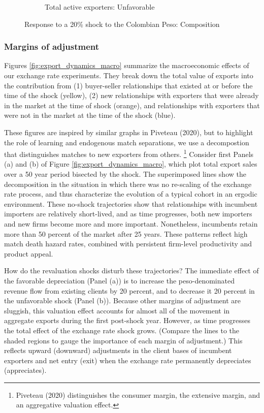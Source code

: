 \documentclass[12pt]{article}
\begin{document}
\begin{figure}[tbp]
\begin{subfigure}[b]{0.5\textwidth}
        \caption{Total active exporters: Unfavorable}
    \end{subfigure}
\caption{Response to a 20\% shock to the Colombian Peso: Composition}
\label{fig:export_dynamics_average}
\end{figure}

\subsubsection{Margins of adjustment }

Figures \ref{fig:export_dynamics_macro} summarize the macroeconomic effects
of our exchange rate experiments. They break down the total value of exports
into the contribution from (1) buyer-seller relationships that existed at or
before the time of the shock (yellow), (2) new relationships with exporters
that were already in the market at the time of shock (orange), and
relationships with exporters that were not in the market at the time of the
shock (blue).

These figures are inspired by similar graphs in Piveteau (2020), but to
highlight the role of learning and endogenous match separations, we use a
decompostion that distinguishes matches to new exporters from others.%
\footnote{%
Piveteau (2020) distinguishes the consumer margin, the extensive margin, and
an aggregative valuation effect.} Consider first Panels (a) and (b) of
Figure \ref{fig:export_dynamics_macro}, which plot total export sales over a
50 year period bisected by the shock. The superimposed lines show the
decomposition in the situation in which there was no re-scaling of the
exchange rate process, and thus characterize the evolution of a typical
cohort in an ergodic environment. These no-shock trajectories show that
relationships with incumbent importers are relatively short-lived, and as
time progresses, both new importers and new firms become more and more
important. Nonetheless, incumbents retain more than 50 percent of the market
after 25 years. These patterns reflect high match death hazard rates,
combined with persistent firm-level productivity and product appeal.

How do the revaluation shocks disturb these trajectories? The immediate
effect of the favorable depreciation (Panel (a)) is to increase the
peso-denominated revenue flow from existing clients by 20 percent, and to
decrease it 20 percent in the unfavorable shock (Panel (b)). Because other
margins of adjustment are sluggish, this valuation effect accounts for
almost all of the movement in aggregate exports during the first post-shock
year. However, as time progresses the total effect of the exchange rate
shock grows. (Compare the lines to the shaded regions to gauge the
importance of each margin of adjustment.) This reflects upward (downward)
adjustments in the client bases of incumbent exporters and net entry (exit)
when the exchange rate permanently depreciates (appreciates).
\end{document}
